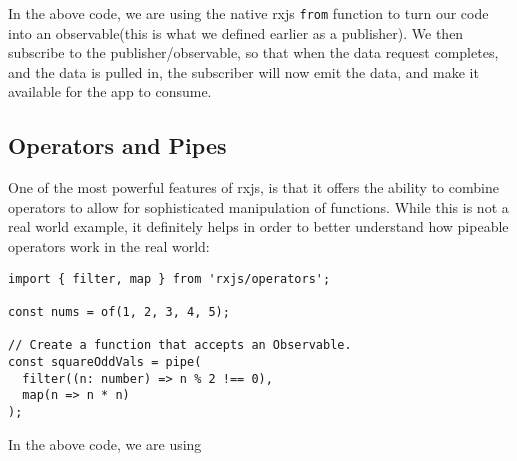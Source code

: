 
In the above code, we are using the native rxjs \lstinline{from} function to
turn our code into an observable(this is what we defined earlier as a 
publisher). We then subscribe to the publisher/observable, so that when the 
data request completes, and the data is pulled in, the subscriber will now 
emit the data, and make it available for the app to consume. 

\subsection{ Operators and Pipes }
One of the most powerful features of rxjs, is that it offers the ability to 
combine operators to allow for sophisticated manipulation of functions. While 
this is not a real world example, it definitely helps in order to better 
understand how pipeable operators work in the real world: 
\begin{lstlisting}
import { filter, map } from 'rxjs/operators';

const nums = of(1, 2, 3, 4, 5);
  
// Create a function that accepts an Observable.
const squareOddVals = pipe(
  filter((n: number) => n % 2 !== 0),
  map(n => n * n)
);  
\end{lstlisting}


In the above code, we are using 





